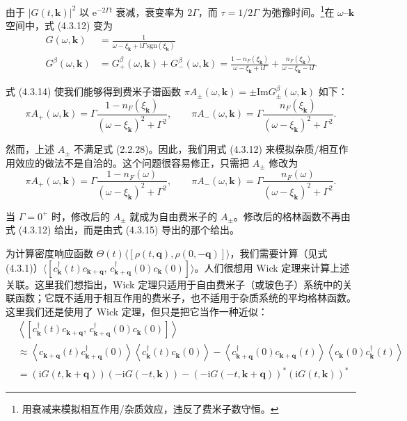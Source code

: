 由于 $|G(t,\pmb{k})|^2$ 以 $\mathrm{e}^{-2\Gamma t}$ 衰减，衰变率为 $2\Gamma$，而 $\tau=1/2\Gamma$ 为弛豫时间。\footnote{用衰减来模拟相互作用/杂质效应，违反了费米子数守恒。}在 $\omega$–$\pmb{k}$ 空间中，式 (4.3.12) 变为
\begin{align*}
G(\omega,\pmb{k}) &= \frac{1}{\omega-\xi_{\pmb{k}}+\mathrm{i}\Gamma\,\mathrm{sgn}(\xi_{\pmb{k}})} \tag{4.3.13}\\
G^{\beta}(\omega,\pmb{k}) &= G^{\beta}_+(\omega,\pmb{k}) + G^{\beta}_-(\omega,\pmb{k}) = \frac{1-n_F(\xi_{\pmb{k}})}{\omega-\xi_{\pmb{k}}+\mathrm{i}\Gamma} + \frac{n_F(\xi_{\pmb{k}})}{\omega-\xi_{\pmb{k}}-\mathrm{i}\Gamma} \tag{4.3.14}
\end{align*}

式 (4.3.14) 使我们能够得到费米子谱函数 $\pi A_{\pm}(\omega,\pmb{k})=\pm\mathrm{Im}G^{\beta}_{\pm}(\omega,\pmb{k})$ 如下：
\begin{equation*}
\pi A_+(\omega,\pmb{k}) = \Gamma\frac{1-n_F(\xi_{\pmb{k}})}{(\omega-\xi_{\pmb{k}})^2+\Gamma^2}, \qquad \pi A_-(\omega,\pmb{k}) = \Gamma\frac{n_F(\xi_{\pmb{k}})}{(\omega-\xi_{\pmb{k}})^2+\Gamma^2}.
\end{equation*}

然而，上述 $A_{\pm}$ 不满足式 (2.2.28)。因此，我们用式 (4.3.12) 来模拟杂质/相互作用效应的做法不是自洽的。这个问题很容易修正，只需把 $A_{\pm}$ 修改为
\begin{equation*}
\pi A_+(\omega,\pmb{k}) = \Gamma\frac{1-n_F(\omega)}{(\omega-\xi_{\pmb{k}})^2+\Gamma^2}, \qquad \pi A_-(\omega,\pmb{k}) = \Gamma\frac{n_F(\omega)}{(\omega-\xi_{\pmb{k}})^2+\Gamma^2}. \tag{4.3.15}
\end{equation*}

当 $\Gamma=0^{+}$ 时，修改后的 $A_{\pm}$ 就成为自由费米子的 $A_{\pm}$。修改后的格林函数不再由式 (4.3.12) 给出，而是由式 (4.3.15) 导出的那个给出。

为计算密度响应函数 $\Theta(t)\langle[\rho(t,\pmb{q}),\allowbreak\rho(0,-\pmb{q})]\rangle$，我们需要计算（见式 (4.3.1)）$\langle[c^{\dagger}_{\pmb{k}}(t)c_{\pmb{k}+\pmb{q}},\allowbreak\, c^{\dagger}_{\pmb{k}+\pmb{q}}(0)c_{\pmb{k}}(0)]\rangle$。人们很想用 Wick 定理来计算上述关联。这里我们想指出，Wick 定理只适用于自由费米子（或玻色子）系统中的关联函数；它既不适用于相互作用的费米子，也不适用于杂质系统的平均格林函数。这里我们还是使用了 Wick 定理，但只是把它当作一种近似：
\begin{align*}
&\left\langle \left[c^{\dagger}_{\pmb{k}}(t)c_{\pmb{k}+\pmb{q}},\, c^{\dagger}_{\pmb{k}+\pmb{q}}(0)c_{\pmb{k}}(0)\right] \right\rangle\\
&\approx \left\langle c_{\pmb{k}+\pmb{q}}(t)c^{\dagger}_{\pmb{k}+\pmb{q}}(0) \right\rangle \left\langle c^{\dagger}_{\pmb{k}}(t)c_{\pmb{k}}(0) \right\rangle - \left\langle c^{\dagger}_{\pmb{k}+\pmb{q}}(0)c_{\pmb{k}+\pmb{q}}(t) \right\rangle \left\langle c_{\pmb{k}}(0)c^{\dagger}_{\pmb{k}}(t) \right\rangle\\
&= \left(\mathrm{i}G(t,\pmb{k}+\pmb{q})\right)\left(-\mathrm{i}G(-t,\pmb{k})\right) - \left(-\mathrm{i}G(-t,\pmb{k}+\pmb{q})\right)^{*}\left(\mathrm{i}G(t,\pmb{k})\right)^{*}
\end{align*}

